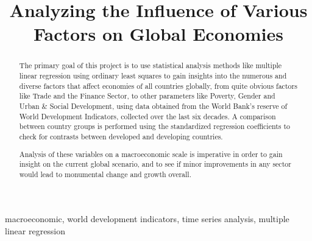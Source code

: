 \documentclass[conference]{IEEEtran}
\begin{document}
\title{Analyzing the Influence of Various Factors on Global Economies}

\author{
\and
{}
\and
{}
}

\maketitle

\begin{abstract}
The primary goal of this project is to use statistical analysis methods 
like multiple linear regression using ordinary least squares to gain insights 
into the numerous and diverse factors that affect economies 
of all countries globally, from quite obvious factors like 
Trade and the Finance Sector, to other parameters like Poverty, 
Gender and Urban \& Social Development, using data obtained from the 
World Bank's reserve of World Development Indicators, collected over the 
last six decades. A comparison between country groups is performed using 
the standardized regression coefficients to check for contrasts between 
developed and developing countries.

Analysis of these variables on a macroeconomic scale is imperative in 
order to gain insight on the current global scenario, 
and to see if minor improvements in any sector would lead to 
monumental change and growth overall. \\
\end{abstract}

\begin{IEEEkeywords}
macroeconomic, world development indicators, time series analysis, multiple linear regression
\end{IEEEkeywords}
\end{document}
